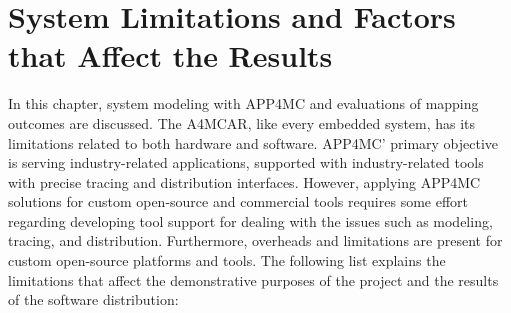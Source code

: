 \section{System Limitations and Factors that Affect the Results} %
In this chapter, system modeling with APP4MC and evaluations of mapping outcomes are discussed. The A4MCAR, like every embedded system, has its limitations related to both hardware and software. APP4MC' primary objective is serving industry-related applications, supported with industry-related tools with precise tracing and distribution interfaces. However, applying APP4MC solutions for custom open-source and commercial tools requires some effort regarding developing tool support for dealing with the issues such as modeling, tracing, and distribution. Furthermore, overheads and limitations are present for custom open-source platforms and tools. The following list explains the limitations that affect the demonstrative purposes of the project and the results of the software distribution:
